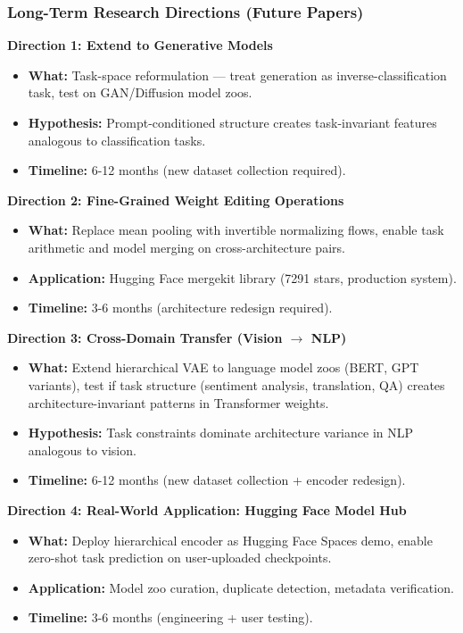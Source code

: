 \subsubsection{Long-Term Research Directions (Future Papers)}

\textbf{Direction 1: Extend to Generative Models}

\begin{itemize}
\item \textbf{What:} Task-space reformulation --- treat generation as inverse-classification task, test on GAN/Diffusion model zoos.
\item \textbf{Hypothesis:} Prompt-conditioned structure creates task-invariant features analogous to classification tasks.
\item \textbf{Timeline:} 6-12 months (new dataset collection required).
\end{itemize}

\textbf{Direction 2: Fine-Grained Weight Editing Operations}

\begin{itemize}
\item \textbf{What:} Replace mean pooling with invertible normalizing flows, enable task arithmetic and model merging on cross-architecture pairs.
\item \textbf{Application:} Hugging Face mergekit library (7291 stars, production system).
\item \textbf{Timeline:} 3-6 months (architecture redesign required).
\end{itemize}

\textbf{Direction 3: Cross-Domain Transfer (Vision $\to$ NLP)}

\begin{itemize}
\item \textbf{What:} Extend hierarchical VAE to language model zoos (BERT, GPT variants), test if task structure (sentiment analysis, translation, QA) creates architecture-invariant patterns in Transformer weights.
\item \textbf{Hypothesis:} Task constraints dominate architecture variance in NLP analogous to vision.
\item \textbf{Timeline:} 6-12 months (new dataset collection + encoder redesign).
\end{itemize}

\textbf{Direction 4: Real-World Application: Hugging Face Model Hub}

\begin{itemize}
\item \textbf{What:} Deploy hierarchical encoder as Hugging Face Spaces demo, enable zero-shot task prediction on user-uploaded checkpoints.
\item \textbf{Application:} Model zoo curation, duplicate detection, metadata verification.
\item \textbf{Timeline:} 3-6 months (engineering + user testing).
\end{itemize}

